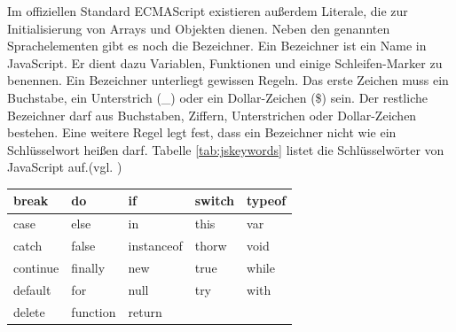 Im offiziellen Standard ECMAScript existieren außerdem Literale, die zur Initialisierung von Arrays und Objekten dienen. Neben den genannten Sprachelementen gibt es noch die Bezeichner. Ein Bezeichner ist ein Name in JavaScript. Er dient dazu Variablen, Funktionen und einige Schleifen-Marker zu benennen. Ein Bezeichner unterliegt gewissen Regeln. Das erste Zeichen muss ein Buchstabe, ein Unterstrich (\_) oder ein Dollar-Zeichen (\$) sein. Der restliche Bezeichner darf aus Buchstaben, Ziffern, Unterstrichen oder Dollar-Zeichen bestehen. Eine weitere Regel legt fest, dass ein Bezeichner nicht wie ein Schlüsselwort heißen darf. Tabelle \ref{tab:jskeywords} listet die Schlüsselwörter von JavaScript auf.(vgl. \cite[S.19]{FlanJava2007})

\vspace{1em}
\begin{center}
  \begin{tabular}{ | l | l | l | l | l | }
  \hline
  break & do & if & switch & typeof\\
  \hline
  case & else & in & this & var\\
  \hline
  catch & false & instanceof & thorw & void\\
  \hline
  continue & finally & new & true & while\\
  \hline
  default & for & null & try & with\\
  \hline
  delete & function & return & &\\
  \hline
  \end{tabular}
  \label{tab:jskeywords}
\end{center}

